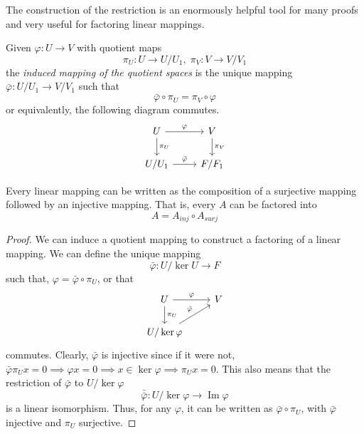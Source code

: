 \documentclass{article}
\DeclareMathOperator{\im}{Im}
\begin{document}
    The construction of the restriction is an enormously helpful tool for many proofs and very useful for factoring linear mappings. 

    \begin{definition}
      Given $\varphi: U \longrightarrow V$ with quotient maps 
      \begin{equation}
        \pi_U: U \longrightarrow U / U_1, \; \pi_V: V \longrightarrow V / V_1
      \end{equation}
      the \textit{induced mapping of the quotient spaces} is the unique mapping $\bar{\varphi}: U/U_1 \longrightarrow V / V_1$ such that 
      \begin{equation}
        \bar{\varphi} \circ \pi_U = \pi_V \circ \varphi
      \end{equation}
      or equivalently, the following diagram commutes. 
      \[\begin{tikzcd}
          U \arrow{r}{\varphi} \arrow{d}{\pi_U} & V \arrow{d}{\pi_V}\\
          U / U_1 \arrow{r}{\bar{\varphi}} & F / F_1
      \end{tikzcd}\]
    \end{definition} 

    \begin{theorem}
      Every linear mapping can be written as the composition of a surjective mapping followed by an injective mapping. That is, every $A$ can be factored into 
      \begin{equation}
        A = A_{inj} \circ A_{surj}
      \end{equation}
    \end{theorem}
    \begin{proof}
      We can induce a quotient mapping to construct a factoring of a linear mapping. We can define the unique mapping 
      \begin{equation}
        \bar{\varphi}: U / \ker{U} \longrightarrow F
      \end{equation}
      such that, $\varphi = \bar{\varphi} \circ \pi_U$, or that 
      \[\begin{tikzcd}
           U \arrow{r}{\varphi} \arrow{d}{\pi_U} & V \\
           U / \ker{\varphi} \arrow{ru}{\bar{\varphi}}
      \end{tikzcd} \]
      commutes. Clearly, $\bar{\varphi}$ is injective since if it were not, $\bar{\varphi} \pi_U x = 0 \implies \varphi x = 0 \implies x \in \ker{\varphi} \implies \pi_U x = 0$. This also means that the restriction of $\bar{\varphi}$ to $U / \ker{\varphi}$
      \begin{equation}
        \bar{\bar{\varphi}}: U / \ker{\varphi} \longrightarrow \im{\varphi}
      \end{equation}
      is a linear isomorphism. Thus, for any $\varphi$, it can be written as $\bar{\varphi} \circ \pi_U$, with $\bar{\varphi}$ injective and $\pi_U$ surjective. 
    \end{proof}
\end{document}
